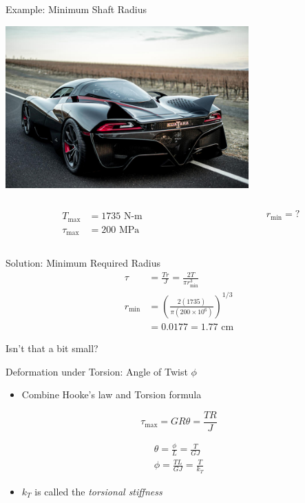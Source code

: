 \documentclass[10pt, svgnames]{beamer}
\begin{document}
\begin{frame}[label={sec:orgb1b7e94}]{Example: Minimum Shaft Radius}
\begin{center}
\includegraphics[width=0.7\textwidth]{./pictures/ssc-tuatara.jpg}
\end{center}

\begin{columns}
\begin{column}{0.5\columnwidth}
\begin{align*}
  T_{\max} &= 1735 \text{ N-m} \\
  \tau_{\max} &= 200 \text{ MPa}
\end{align*}
\end{column}

\begin{column}{0.5\columnwidth}
\[r_{\min} = ?\]
\end{column}
\end{columns}
\end{frame}

\begin{frame}[label={sec:org604aea2}]{Solution: Minimum Required Radius}
\begin{align*}
  \tau &= \frac{Tr}{J} = \frac{2T}{\pi r_{\min}^{3}} \\
  r_{\min} &= \left( \frac{2(1735)}{\pi (200 \times 10^{6})} \right)^{1/3} \\
       &= 0.0177 = 1.77 \text{ cm}
\end{align*}

Isn't that a bit small?
\end{frame}

\begin{frame}[label={sec:org4ccda51}]{Deformation under Torsion: Angle of Twist \(\phi\)}
\begin{itemize}
\item Combine Hooke's law and Torsion formula
\end{itemize}

\[\tau_{\max} = GR\theta = \frac{TR}{J}\]

\begin{gather*}
  \theta = \frac{\phi}{L} = \frac{T}{GJ} \\
  \phi = \frac{TL}{GJ} = \frac{T}{k_T}
\end{gather*}

\begin{itemize}
\item \(k_T\) is called the \emph{torsional stiffness}
\end{itemize}
\end{frame}
\end{document}
